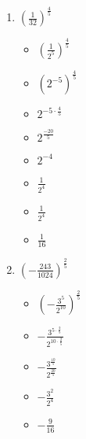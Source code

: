 \documentclass{article}
\begin{document}
\begin{onehalfspace}
\begin{enumerate}[start=15]
        \item $\left( \frac{1}{32} \right)^{\frac{4}{5}}$
        \begin{itemize}
            \item $\left( \frac{1}{2^{5}} \right)^{\frac{4}{5}}$
            \item $\left( 2^{-5} \right)^{\frac{4}{5}}$
            \item $2^{-5 \cdot \frac{4}{5}}$
            \item $2^{\frac{-20}{5}}$
            \item $2^{-4}$
            \item $\frac{1}{2^{4}}$
            \item $\frac{1}{2^{4}}$
            \item $\frac{1}{16}$
        \end{itemize}

        \item $\left( -\frac{243}{1024} \right)^{\frac{2}{5}}$
        \begin{itemize}
            \item $\left( -\frac{3^{5}}{2^{10}} \right)^{\frac{2}{5}}$
            \item $-\frac{3^{5 \cdot \frac{2}{5}}}{2^{10 \cdot \frac{2}{5}}}$
            \item $-\frac{3^{\frac{10}{5}}}{2^{\frac{20}{5}}}$
            \item $-\frac{3^{2}}{2^{4}}$
            \item $-\frac{9}{16}$
        \end{itemize}
    \end{enumerate}
\end{onehalfspace}
\end{document}
